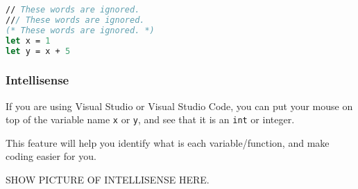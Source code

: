 \documentclass[12pt]{article}
\begin{document}
\begin{lstlisting}[language=FSharp]
// These words are ignored.
/// These words are ignored.
(* These words are ignored. *)
let x = 1
let y = x + 5
\end{lstlisting}

\subsubsection{Intellisense}
If you are using Visual Studio or Visual Studio Code, you can put your mouse on top of the variable name \texttt{x} or \texttt{y}, and see that it is an \texttt{int} or integer.

This feature will help you identify what is each variable/function, and make coding easier for you.
\begin{center}
SHOW PICTURE OF INTELLISENSE HERE.
\end{center}
\end{document}
